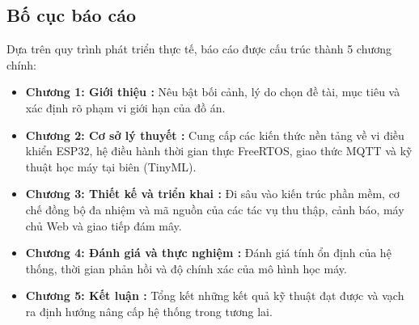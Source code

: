 \subsection{Bố cục báo cáo}

Dựa trên quy trình phát triển thực tế, báo cáo được cấu trúc thành 5 chương chính:
\begin{itemize}
    \item \textbf{Chương 1: Giới thiệu :} Nêu bật bối cảnh, lý do chọn đề tài, mục tiêu và xác định rõ phạm vi giới hạn của đồ án.
    \item \textbf{Chương 2: Cơ sở lý thuyết :} Cung cấp các kiến thức nền tảng về vi điều khiển ESP32, hệ điều hành thời gian thực FreeRTOS, giao thức MQTT và kỹ thuật học máy tại biên (TinyML).
    \item \textbf{Chương 3: Thiết kế và triển khai :} Đi sâu vào kiến trúc phần mềm, cơ chế đồng bộ đa nhiệm và mã nguồn của các tác vụ thu thập, cảnh báo, máy chủ Web và giao tiếp đám mây.
    \item \textbf{Chương 4: Đánh giá và thực nghiệm :} Đánh giá tính ổn định của hệ thống, thời gian phản hồi và độ chính xác của mô hình học máy.
    \item \textbf{Chương 5: Kết luận :} Tổng kết những kết quả kỹ thuật đạt được và vạch ra định hướng nâng cấp hệ thống trong tương lai.
\end{itemize}